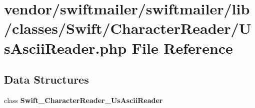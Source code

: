 \section{vendor/swiftmailer/swiftmailer/lib/classes/\+Swift/\+Character\+Reader/\+Us\+Ascii\+Reader.php File Reference}
\label{_us_ascii_reader_8php}
\subsection*{Data Structures}
\begin{DoxyCompactItemize}
\item 
class {\bf Swift\+\_\+\+Character\+Reader\+\_\+\+Us\+Ascii\+Reader}
\end{DoxyCompactItemize}
